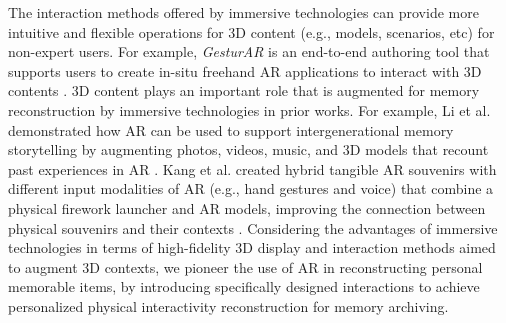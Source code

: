 
The interaction methods offered by immersive technologies can provide more intuitive and flexible operations for 3D content (e.g., models, scenarios, etc) for non-expert users\cite{10.1145/3472749.3474769,whitlock2020mrcat,10.1145/3544548.3581148}. 
For example, \textit{GesturAR} is an end-to-end authoring tool that supports users to create in-situ freehand AR applications to interact with 3D contents \cite{10.1145/3472749.3474769}.
3D content plays an important role that is augmented for memory reconstruction by immersive technologies in prior works. 
For example, Li et al. demonstrated how AR can be used to support intergenerational memory storytelling by augmenting photos, videos, music, and 3D models that recount past experiences in AR \cite{10.1145/3610903}.
Kang et al. created hybrid tangible AR souvenirs with different input modalities of AR (e.g., hand gestures and voice) that combine a physical firework launcher and AR models, improving the connection between physical souvenirs and their contexts \cite{10.1145/3526114.3558722}.
Considering the advantages of immersive technologies in terms of high-fidelity 3D display and interaction methods aimed to augment 3D contexts, we pioneer the use of AR in reconstructing personal memorable items, by introducing specifically designed interactions to achieve personalized physical interactivity reconstruction for memory archiving.




